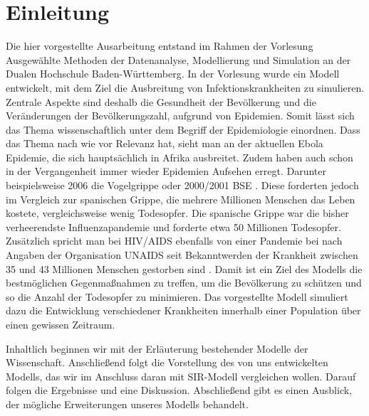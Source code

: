 \section*{Einleitung}

Die hier vorgestellte Ausarbeitung entstand im Rahmen der Vorlesung \glqq Ausgewählte Methoden der Datenanalyse, Modellierung und Simulation\grqq\; an der Dualen Hochschule Baden-Württemberg.
In der Vorlesung wurde ein Modell entwickelt, mit dem Ziel die Ausbreitung von Infektionskrankheiten zu simulieren.
Zentrale Aspekte sind deshalb die Gesundheit der Bevölkerung und die Veränderungen der Bevölkerungszahl, aufgrund von Epidemien. Somit lässt sich das Thema wissenschaftlich unter dem Begriff der Epidemiologie einordnen.
Dass das Thema nach wie vor Relevanz hat, sieht man an der aktuellen Ebola Epidemie, die sich hauptsächlich in Afrika ausbreitet. Zudem haben auch schon in der Vergangenheit immer wieder Epidemien Aufsehen erregt. Darunter beispielsweise 2006 die Vogelgrippe  \cite{gehlhoff2007chronik}
oder 2000/2001 BSE \cite{Spon:2014}. Diese forderten jedoch im Vergleich zur spanischen Grippe, die mehrere Millionen Menschen das Leben kostete, vergleichsweise wenig Todesopfer. Die spanische Grippe war die bisher verheerendste Influenzapandemie und forderte etwa 50 Millionen Todesopfer\cite{welt:2014}. Zusätzlich spricht man bei HIV/AIDS ebenfalls von einer Pandemie bei nach Angaben der Organisation UNAIDS seit Bekanntwerden der Krankheit zwischen 35 und 43 Millionen Menschen gestorben sind \cite{UNAIDS:2014}.
Damit ist ein Ziel des Modells die bestmöglichen Gegenmaßnahmen zu treffen, um die Bevölkerung zu schützen und so die Anzahl der Todesopfer zu minimieren.
Das vorgestellte Modell simuliert dazu die Entwicklung verschiedener Krankheiten innerhalb einer Population über einen gewissen Zeitraum. 
\smallskip

Inhaltlich beginnen wir mit der Erläuterung bestehender Modelle der Wissenschaft. Anschließend folgt die Vorstellung des von uns entwickelten Modells, das wir im Anschluss daran mit SIR-Modell vergleichen wollen. Darauf folgen die Ergebnisse und eine Diskussion. Abschließend gibt es einen Ausblick, der mögliche Erweiterungen unseres Modells behandelt. 

